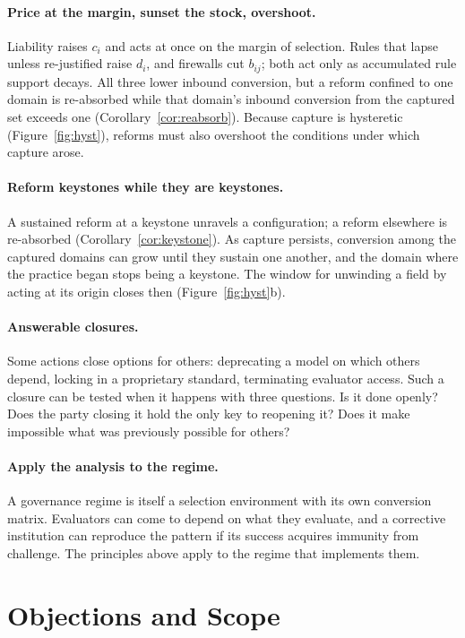 \documentclass[letterpaper]{article} %
\theoremstyle{definition}
\begin{document}
\paragraph{Price at the margin, sunset the stock, overshoot.} Liability raises $c_i$ and acts at once on the margin of selection. Rules that lapse unless re-justified raise $d_i$, and firewalls cut $b_{ij}$; both act only as accumulated rule support decays. All three lower inbound conversion, but a reform confined to one domain is re-absorbed while that domain's inbound conversion from the captured set exceeds one (Corollary~\ref{cor:reabsorb}). Because capture is hysteretic (Figure~\ref{fig:hyst}), reforms must also overshoot the conditions under which capture arose.

\paragraph{Reform keystones while they are keystones.} A sustained reform at a keystone unravels a configuration; a reform elsewhere is re-absorbed (Corollary~\ref{cor:keystone}). As capture persists, conversion among the captured domains can grow until they sustain one another, and the domain where the practice began stops being a keystone. The window for unwinding a field by acting at its origin closes then (Figure~\ref{fig:hyst}b).

\paragraph{Answerable closures.} Some actions close options for others: deprecating a model on which others depend, locking in a proprietary standard, terminating evaluator access. Such a closure can be tested when it happens with three questions. Is it done openly? Does the party closing it hold the only key to reopening it? Does it make impossible what was previously possible for others?

\paragraph{Apply the analysis to the regime.} A governance regime is itself a selection environment with its own conversion matrix. Evaluators can come to depend on what they evaluate, and a corrective institution can reproduce the pattern if its success acquires immunity from challenge. The principles above apply to the regime that implements them.

\section{Objections and Scope}\label{sec:objections}
\end{document}

